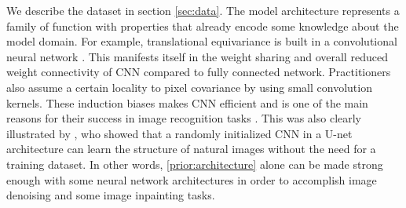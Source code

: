 \documentclass[twocolumn]{aastex631}
\begin{document}
We describe the dataset in section \ref{sec:data}. The model 
architecture represents a family of function with properties 
that already encode some knowledge 
about the model domain. For example, translational equivariance is built in 
a convolutional neural network \citep[CNN, ][]{lecun1995}. This 
manifests itself in the weight sharing and overall 
reduced weight connectivity of CNN compared to fully connected network.
Practitioners also 
assume a certain locality to pixel covariance by using small convolution 
kernels. These induction 
biases makes CNN efficient
and is one of the main reasons for their success in image recognition tasks
\citep{Krizhevsky2012}.
This was also clearly illustrated by \citet{Ulyanov2017}, who showed that a randomly initialized CNN in a U-net architecture \citep{Ronneberger2015}
can learn the structure of natural images without the need for a training dataset. In other words, \ref{prior:architecture} 
alone can be made strong enough with some neural network architectures
in order to accomplish image denoising and some image inpainting tasks.
\end{document}
